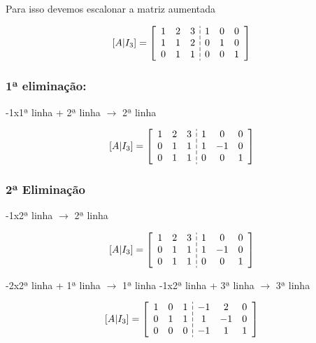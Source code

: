 \documentclass{article}
\begin{document}
Para isso devemos escalonar a matriz aumentada

$$
[A | I_3] = 
\setlength{\dashlinegap}{2pt}
\left[\begin{array}{ccc:ccc}
  1 & 2 & 3 & 1 & 0 & 0 \\
  1 & 1 & 2 & 0 & 1 & 0 \\
  0 & 1 & 1 & 0 & 0 & 1 \\
  \end{array}
\right]
$$

\subsubsection*{1ª eliminação:}
-1x1ª linha + 2ª linha $\longrightarrow $ 2ª linha \newline

$$
[A | I_3] = 
\setlength{\dashlinegap}{2pt}
\left[\begin{array}{ccc:ccc}
  1 & 2 & 3 & 1 & 0 & 0 \\
  0 & 1 & 1 & 1 & -1 & 0 \\
  0 & 1 & 1 & 0 & 0 & 1 \\
  \end{array}
\right] 
$$

\subsubsection*{2ª Eliminação}
-1x2ª linha $\longrightarrow $ 2ª linha \newline

$$
[A | I_3] = 
\setlength{\dashlinegap}{2pt}
\left[\begin{array}{ccc:ccc}
  1 & 2 & 3 & 1 & 0 & 0 \\
  0 & 1 & 1 & 1 & -1 & 0 \\
  0 & 1 & 1 & 0 & 0 & 1 \\
  \end{array}
\right] 
$$

-2x2ª linha + 1ª linha $\longrightarrow $ 1ª linha \newline
-1x2ª linha + 3ª linha $\longrightarrow $ 3ª linha \newline

$$
[A | I_3] = 
\setlength{\dashlinegap}{2pt}
\left[\begin{array}{ccc:ccc}
  1 & 0 & 1 & -1 & 2 & 0 \\
  0 & 1 & 1 & 1 & -1 & 0 \\
  0 & 0 & 0 & -1 & 1 & 1 \\
  \end{array}
\right] 
$$
\end{document}

